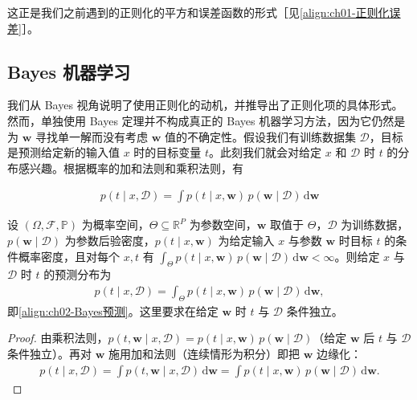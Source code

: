 \documentclass[../../main.tex]{subfiles}
\begin{document}
这正是我们之前遇到的正则化的平方和误差函数的形式［见\eqref{align:ch01-正则化误差}］。

\subsection{Bayes 机器学习}\label{subsection:ch02-Bayes机器学习}

我们从 Bayes 视角说明了使用正则化的动机，并推导出了正则化项的具体形式。然而，单独使用 Bayes 定理并不构成真正的 Bayes 机器学习方法，因为它仍然是为 $\mathbf{w}$ 寻找单一解而没有考虑 $\mathbf{w}$ 值的不确定性。假设我们有训练数据集 $\mathcal{D}$，目标是预测给定新的输入值 $x$ 时的目标变量 $t$。此刻我们就会对给定 $x$ 和 $\mathcal{D}$ 时 $t$ 的分布感兴趣。根据概率的加和法则和乘积法则，有

\begin{align}
  p(t\mid x,\mathcal{D}) = \int p(t\mid x,\mathbf{w})\,p(\mathbf{w}\mid\mathcal{D})\,\mathrm{d}\mathbf{w}
  \label{align:ch02-Bayes预测}
\end{align}

\begin{proposition}\label{proposition:ch02-Bayes预测}
设 $(\Omega,\mathcal{F},\mathbb{P})$ 为概率空间，$\Theta\subseteq\mathbb{R}^{P}$ 为参数空间，$\mathbf{w}$ 取值于 $\Theta$，$\mathcal{D}$ 为训练数据，$p(\mathbf{w}\mid\mathcal{D})$ 为参数后验密度，$p(t\mid x,\mathbf{w})$ 为给定输入 $x$ 与参数 $\mathbf{w}$ 时目标 $t$ 的条件概率密度，且对每个 $x,t$ 有 $\int_{\Theta}p(t\mid x,\mathbf{w})\,p(\mathbf{w}\mid\mathcal{D})\,\mathrm{d}\mathbf{w}<\infty$。则给定 $x$ 与 $\mathcal{D}$ 时 $t$ 的预测分布为
\begin{align*}
  p(t\mid x,\mathcal{D})=\int_{\Theta}p(t\mid x,\mathbf{w})\,p(\mathbf{w}\mid\mathcal{D})\,\mathrm{d}\mathbf{w},
\end{align*}
即\eqref{align:ch02-Bayes预测}。这里要求在给定 $\mathbf{w}$ 时 $t$ 与 $\mathcal{D}$ 条件独立。
\end{proposition}

\begin{proof}
由乘积法则，$p(t,\mathbf{w}\mid x,\mathcal{D})=p(t\mid x,\mathbf{w})\,p(\mathbf{w}\mid\mathcal{D})$（给定 $\mathbf{w}$ 后 $t$ 与 $\mathcal{D}$ 条件独立）。再对 $\mathbf{w}$ 施用加和法则（连续情形为积分）即把 $\mathbf{w}$ 边缘化：
\begin{align*}
  p(t\mid x,\mathcal{D}) = \int p(t,\mathbf{w}\mid x,\mathcal{D})\,\mathrm{d}\mathbf{w}
  = \int p(t\mid x,\mathbf{w})\,p(\mathbf{w}\mid\mathcal{D})\,\mathrm{d}\mathbf{w} .
\end{align*}
\end{proof}
\end{document}
